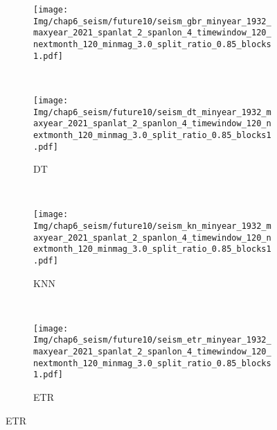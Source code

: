 \begin{figure}[!htbp]
\begin{subfigure}[b]{0.45\textwidth}
    \vspace{-0.2cm}
    \texttt{[image: Img/chap6\_seism/future10/seism\_gbr\_minyear\_1932\_maxyear\_2021\_spanlat\_2\_spanlon\_4\_timewindow\_120\_nextmonth\_120\_minmag\_3.0\_split\_ratio\_0.85\_blocks1.pdf]}
    \vspace{-1cm}
    \label{fig:seism_gbr_minyear_1932_maxyear_2021_spanlat_2_spanlon_4_timewindow_120_nextmonth_120_minmag_3.0_split_ratio_0.85_blocks1}
  \end{subfigure}
  ~
  \begin{subfigure}[b]{0.45\textwidth}
    \caption{DT}
    \vspace{-0.2cm}
    \texttt{[image: Img/chap6\_seism/future10/seism\_dt\_minyear\_1932\_maxyear\_2021\_spanlat\_2\_spanlon\_4\_timewindow\_120\_nextmonth\_120\_minmag\_3.0\_split\_ratio\_0.85\_blocks1.pdf]}
    \vspace{-1cm}
    \label{fig:seism_dt_minyear_1932_maxyear_2021_spanlat_2_spanlon_4_timewindow_120_nextmonth_120_minmag_3.0_split_ratio_0.85_blocks1}
  \end{subfigure}
  \\
  \begin{subfigure}[b]{0.45\textwidth}
    \caption{KNN}
    \vspace{-0.2cm}
    \texttt{[image: Img/chap6\_seism/future10/seism\_kn\_minyear\_1932\_maxyear\_2021\_spanlat\_2\_spanlon\_4\_timewindow\_120\_nextmonth\_120\_minmag\_3.0\_split\_ratio\_0.85\_blocks1.pdf]}
    \vspace{-1cm}
    \label{fig:seism_knn_minyear_1932_maxyear_2021_spanlat_2_spanlon_4_timewindow_120_nextmonth_120_minmag_3.0_split_ratio_0.85_blocks1}
  \end{subfigure}
  ~
  \begin{subfigure}[b]{0.45\textwidth}
    \caption{ETR}
    \vspace{-0.2cm}
    \texttt{[image: Img/chap6\_seism/future10/seism\_etr\_minyear\_1932\_maxyear\_2021\_spanlat\_2\_spanlon\_4\_timewindow\_120\_nextmonth\_120\_minmag\_3.0\_split\_ratio\_0.85\_blocks1.pdf]}
    \vspace{-1cm}
    \label{fig:seism_etr_minyear_1932_maxyear_2021_spanlat_2_spanlon_4_timewindow_120_nextmonth_120_minmag_3.0_split_ratio_0.85_blocks1}
  \end{subfigure}
  \label{fig:seism_minyear_1932_maxyear_2021_spanlat_2_spanlon_4_timewindow_120_nextmonth_120_minmag_3.0_split_ratio_0.85_blocks1}
\end{figure}



